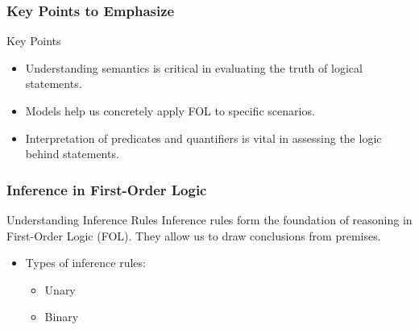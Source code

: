 \documentclass[aspectratio=169]{beamer}
\begin{document}
\begin{frame}[fragile]
    \frametitle{Key Points to Emphasize}
    \begin{block}{Key Points}
        \begin{itemize}
            \item Understanding semantics is critical in evaluating the truth of logical statements.
            \item Models help us concretely apply FOL to specific scenarios.
            \item Interpretation of predicates and quantifiers is vital in assessing the logic behind statements.
        \end{itemize}
    \end{block}
\end{frame}

\begin{frame}[fragile]
    \frametitle{Inference in First-Order Logic}
    \begin{block}{Understanding Inference Rules}
        Inference rules form the foundation of reasoning in First-Order Logic (FOL). They allow us to draw conclusions from premises.
    \end{block}
    \begin{itemize}
        \item Types of inference rules:
        \begin{itemize}
            \item Unary
            \item Binary
        \end{itemize}
    \end{itemize}
\end{frame}
\end{document}
